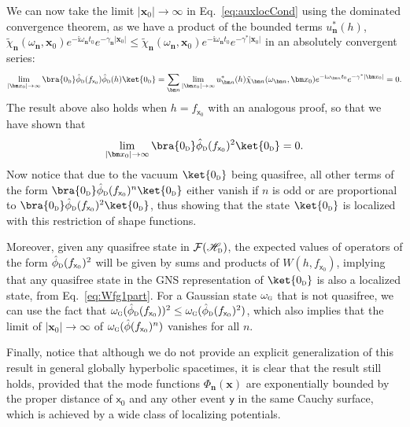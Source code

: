 \documentclass[letterpaper,12pt,titlepage,oneside,final]{book}
\newcommand{\mf}{\mathsf}%
\newcommand{\ii}{\mathrm{i}}
\newcommand{\tc}[1]{\textsc{#1}}
\begin{document}
We can now take the limit $|\bm x_0|\to \infty$ in Eq.~\eqref{eq:auxlocCond} using the dominated convergence theorem, as we have a product of the bounded terms $u_{\bm n}^*(h)$, $\tilde{\chi}_{\bm n}(\omega_{\bm n},\bm x_0)e^{-\ii \omega_{\bm n} t_0}e^{-\gamma_{\bm n}|\bm x_0|}\leq \tilde{\chi}_{\bm n}(\omega_{\bm n},\bm x_0)e^{-\ii \omega_{\bm n} t_0}e^{-\gamma^*|\bm x_0|}$ in an absolutely convergent series:
\begin{equation}
    \lim_{|\bm x_0|\to \infty }\bra{0_\tc{d}}\hat{\phi}_\tc{d}(f_{\mf x_0})\hat{\phi}_\tc{d}(h)\ket{0_\tc{d}} = \sum_{\bm n} \lim_{|\bm x_0|\to \infty} u_{\bm n}^*(h)\tilde{\chi}_{\bm n}(\omega_{\bm n},\bm x_0) e^{-\ii \omega_{\bm n} t_0} e^{-\gamma^*|\bm x_0|} = 0.
\end{equation}
The result above also holds when $h = f_{\mf x_0}$ with an analogous proof, so that we have shown that
\begin{equation}
    \lim_{|\bm x_0|\to \infty }\bra{0_\tc{d}}\hat{\phi}_\tc{d}(f_{\mf x_0})^2\ket{0_\tc{d}} =  0.
\end{equation}
Now notice that due to the vacuum $\ket{0_\tc{d}}$ being quasifree, all other terms of the form $\bra{0_\tc{d}}\hat{\phi}_\tc{d}(f_{\mf x_0})^n\ket{0_\tc{d}}$ either vanish if $n$ is odd or are proportional to $\bra{0_\tc{d}}\hat{\phi}_\tc{d}(f_{\mf x_0})^2\ket{0_\tc{d}}$, thus showing that the state $\ket{0_\tc{d}}$ is localized with this restriction of shape functions.

Moreover, given any quasifree state in $\mathcal{F}(\mathscr{H}_\tc{d})$, the expected values of operators of the form $\hat{\phi}_\tc{d}(f_{\mf x_0})^2$ will be given by sums and products of $W(h,{f}_{\mf x_0})$, implying that any quasifree state in the GNS representation of $\ket{0_\tc{d}}$ is also a localized state, from Eq.~\eqref{eq:Wfg1part}. For a Gaussian state $\omega_\tc{g}$ that is not quasifree, we can use the fact that $\omega_\tc{g}(\hat{\phi}_\tc{d}(f_{\mf x_0}))^2 \leq \omega_\tc{g}(\hat{\phi}_\tc{d}(f_{\mf x_0})^2)$, which also implies that the limit of $|\bm x_0|\to \infty$ of $\omega_\tc{g}(\hat{\phi}(f_{\mf x_0})^n)$ vanishes for all $n$.

Finally, notice that although we do not provide an explicit generalization of this result in general globally hyperbolic spacetimes, it is clear that the result still holds, provided that the mode functions $\Phi_{\bm n}(\bm x)$ are exponentially bounded by the proper distance of $\mf x_0$ and any other event $\mf y$ in the same Cauchy surface, which is achieved by a wide class of localizing potentials.
\end{document}
